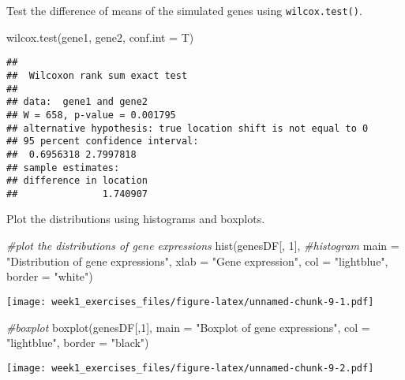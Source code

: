 \documentclass[
]{article}
\newenvironment{Shaded}{\begin{snugshade}}{\end{snugshade}}
\newcommand{\AttributeTok}[1]{\textcolor[rgb]{0.77,0.63,0.00}{#1}}
\newcommand{\CommentTok}[1]{\textcolor[rgb]{0.56,0.35,0.01}{\textit{#1}}}
\newcommand{\DecValTok}[1]{\textcolor[rgb]{0.00,0.00,0.81}{#1}}
\newcommand{\FunctionTok}[1]{\textcolor[rgb]{0.00,0.00,0.00}{#1}}
\newcommand{\NormalTok}[1]{#1}
\newcommand{\StringTok}[1]{\textcolor[rgb]{0.31,0.60,0.02}{#1}}
\begin{document}
Test the difference of means of the simulated genes using
\texttt{wilcox.test()}.

\begin{Shaded}
\begin{Highlighting}[]
\FunctionTok{wilcox.test}\NormalTok{(gene1, gene2, }\AttributeTok{conf.int =}\NormalTok{ T)}
\end{Highlighting}
\end{Shaded}

\begin{verbatim}
## 
##  Wilcoxon rank sum exact test
## 
## data:  gene1 and gene2
## W = 658, p-value = 0.001795
## alternative hypothesis: true location shift is not equal to 0
## 95 percent confidence interval:
##  0.6956318 2.7997818
## sample estimates:
## difference in location 
##               1.740907
\end{verbatim}

Plot the distributions using histograms and boxplots.

\begin{Shaded}
\begin{Highlighting}[]
\CommentTok{\#plot the distributions of gene expressions}
\FunctionTok{hist}\NormalTok{(genesDF[, }\DecValTok{1}\NormalTok{], }\CommentTok{\#histogram}
     \AttributeTok{main =} \StringTok{"Distribution of gene expressions"}\NormalTok{,}
     \AttributeTok{xlab =} \StringTok{"Gene expression"}\NormalTok{,}
     \AttributeTok{col =} \StringTok{"lightblue"}\NormalTok{, }\AttributeTok{border =} \StringTok{"white"}\NormalTok{)}
\end{Highlighting}
\end{Shaded}

\texttt{[image: week1\_exercises\_files/figure-latex/unnamed-chunk-9-1.pdf]}

\begin{Shaded}
\begin{Highlighting}[]
\CommentTok{\#boxplot}
\FunctionTok{boxplot}\NormalTok{(genesDF[,}\DecValTok{1}\NormalTok{],}
     \AttributeTok{main =} \StringTok{"Boxplot of gene expressions"}\NormalTok{,}
     \AttributeTok{col =} \StringTok{"lightblue"}\NormalTok{, }\AttributeTok{border =} \StringTok{"black"}\NormalTok{)}
\end{Highlighting}
\end{Shaded}

\texttt{[image: week1\_exercises\_files/figure-latex/unnamed-chunk-9-2.pdf]}
\end{document}
